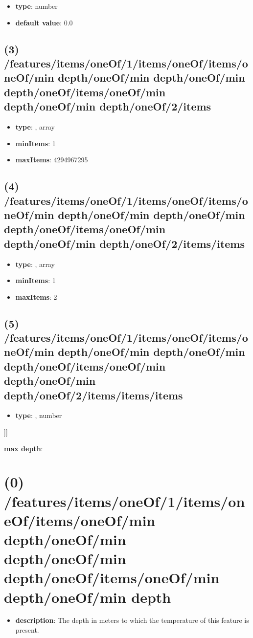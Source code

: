\begin{itemize}[leftmargin=4em]\item {\bf type}: number\item {\bf default value}: 0.0
\end{itemize}\subsection{(3) /features/items/oneOf/1/items/oneOf/items/oneOf/min depth/oneOf/min depth/oneOf/min depth/oneOf/items/oneOf/min depth/oneOf/min depth/oneOf/2/items}
\begin{itemize}[leftmargin=3em]\item {\bf type}: , array\item {\bf minItems}: 1
\item {\bf maxItems}: 4294967295
\end{itemize}\subsection{(4) /features/items/oneOf/1/items/oneOf/items/oneOf/min depth/oneOf/min depth/oneOf/min depth/oneOf/items/oneOf/min depth/oneOf/min depth/oneOf/2/items/items}
\begin{itemize}[leftmargin=4em]\item {\bf type}: , array\item {\bf minItems}: 1
\item {\bf maxItems}: 2
\end{itemize}\subsection{(5) /features/items/oneOf/1/items/oneOf/items/oneOf/min depth/oneOf/min depth/oneOf/min depth/oneOf/items/oneOf/min depth/oneOf/min depth/oneOf/2/items/items/items}
\begin{itemize}[leftmargin=5em]\item {\bf type}: , number\end{itemize}]]\item {\bf max depth}: \section{(0) /features/items/oneOf/1/items/oneOf/items/oneOf/min depth/oneOf/min depth/oneOf/min depth/oneOf/items/oneOf/min depth/oneOf/min depth}
\begin{itemize}[leftmargin=0em]\item {\bf description}: The depth in meters to which the temperature of this feature is present.
\end{itemize}
